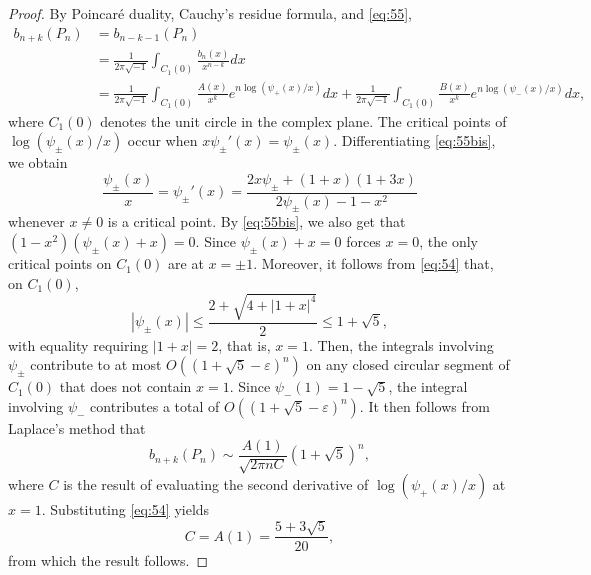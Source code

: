 \documentclass[12pt]{amsart}
\theoremstyle{definition}
\begin{document}
\begin{proof}
By Poincar\'e duality, Cauchy's residue formula, and \eqref{eq:55},
\begin{align*}
b_{n+k}(P_n)&=b_{n-k-1}(P_n)\\
&=\frac{1}{2\pi \sqrt{-1}} \int_{C_1(0)} \frac{b_n(x)}{x^{n-k}} dx \\
&=\frac{1}{2\pi \sqrt{-1}} \int_{C_1(0)} \frac{A(x)}{x^{k}}e^{n\log(\psi_+(x)/x)} dx + \frac{1}{2\pi \sqrt{-1}} \int_{C_1(0)} \frac{B(x)}{x^k}e^{n\log(\psi_-(x)/x)} dx,
\end{align*}
where $C_1(0)$ denotes the unit circle in the complex plane. The critical points of $\log(\psi_\pm(x)/x)$ occur when $x\psi_{\pm}'(x)=\psi_\pm(x)$. Differentiating \eqref{eq:55bis}, we obtain
\[
\frac{\psi_\pm(x)}{x}=\psi_{\pm}'(x)=\frac{2x\psi_\pm+(1+x)(1+3x)}{2\psi_{\pm}(x)-1-x^2}
\]
whenever $x\neq 0$ is a critical point. By \eqref{eq:55bis}, we also get that $(1-x^2)(\psi_{\pm}(x)+x)=0$. Since $\psi_{\pm}(x)+x=0$ forces $x=0$, the only critical points on $C_{1}(0)$ are at $x=\pm 1$. Moreover, it follows from \eqref{eq:54} that, on $C_1(0)$,
\[
|\psi_{\pm}(x)|\le \frac{2+\sqrt{4+|1+x|^4}}{2}\le 1+\sqrt{5},
\]
with equality requiring $|1+x|=2$, that is, $x=1$. Then, the integrals involving $\psi_{\pm}$ contribute to at most $O((1+\sqrt{5}-\varepsilon)^n)$ on any closed circular segment of $C_1(0)$ that does not contain $x=1$. Since $\psi_-(1)=1-\sqrt{5}$, the integral involving $\psi_-$ contributes a total of $O((1+\sqrt{5}-\varepsilon)^n)$. It then follows from Laplace's method that
\[
b_{n+k}(P_n)\sim \frac{A(1)}{\sqrt{2\pi n C}} (1+\sqrt{5})^n,
\]
where $C$ is the result of evaluating the second derivative of $\log(\psi_+(x)/x)$ at $x=1$. Substituting \eqref{eq:54} yields
\[
C=A(1)=\frac{5+3\sqrt{5}}{20},
\]
from which the result follows.
\end{proof}



\end{document}
